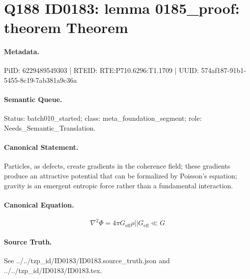 \section*{Q188 ID0183: lemma 0185\_proof: theorem Theorem}
\paragraph{Metadata.}
PiID: 6229489549303 | RTEID: RTE:P710.6296:T1.1709 | UUID: 574af187-91b1-5455-8c19-7ab381a9c36a

\paragraph{Semantic Queue.}
Status: batch010\_started; class: meta\_foundation\_segment; role: Needs\_Semantic\_Translation.

\paragraph{Canonical Statement.}
Particles, as defects, create gradients in the coherence field; these gradients produce an attractive potential that can be formalized by Poisson's equation; gravity is an emergent entropic force rather than a fundamental interaction.

\paragraph{Canonical Equation.}
\[
\nabla^2 \Phi = 4\pi G_{\mathrm{eff}}\rho || G_{\mathrm{eff}} \ll G
\]

\paragraph{Source Truth.}
See ../../tzp\_id/ID0183/ID0183.source\_truth.json and ../../tzp\_id/ID0183/ID0183.tex.
